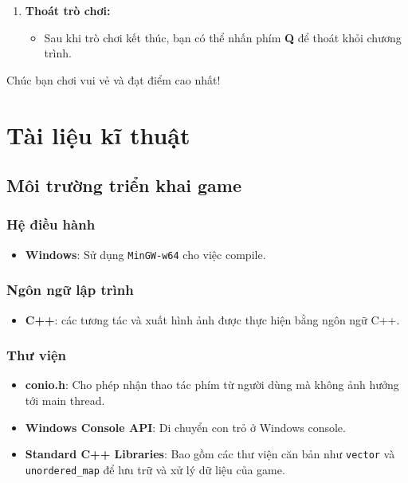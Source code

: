 \documentclass[12pt]{report}
\begin{document}
\begin{enumerate}[label=\arabic*.]
    \item \textbf{Thoát trò chơi:}
    \begin{itemize}
        \item Sau khi trò chơi kết thúc, bạn có thể nhấn phím \textbf{Q} để thoát khỏi chương trình.
    \end{itemize}
\end{enumerate}

Chúc bạn chơi vui vẻ và đạt điểm cao nhất!

\chapter{Tài liệu kĩ thuật}
\label{sec:technical_detail}

\section{Môi trường triển khai game}

\subsection*{Hệ điều hành}
\begin{itemize}
    \item \textbf{Windows}: Sử dụng \texttt{MinGW-w64} cho việc compile.
\end{itemize}

\subsection*{Ngôn ngữ lập trình}
\begin{itemize}
    \item \textbf{C++}: các tương tác và xuất hình ảnh được thực hiện bằng ngôn ngữ C++.
\end{itemize}

\subsection*{Thư viện}
\begin{itemize}
    \item \textbf{conio.h}: Cho phép nhận thao tác phím từ người dùng mà không ảnh hưởng tới main thread.
    \item \textbf{Windows Console API}: Di chuyển con trỏ ở Windows console.
    \item \textbf{Standard C++ Libraries}: Bao gồm các thư viện căn bản như \texttt{vector} và \texttt{unordered\_map} để lưu trữ và xử lý dữ liệu của game.
\end{itemize}
\end{document}

